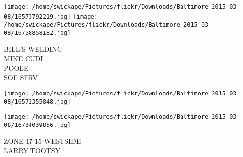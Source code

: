 \documentclass[10pt,letterpaper]{article}
\begin{document}
\texttt{[image: /home/swickape/Pictures/flickr/Downloads/Baltimore 2015-03-08/16573792219.jpg]}
\texttt{[image: /home/swickape/Pictures/flickr/Downloads/Baltimore 2015-03-08/16758858182.jpg]}

BILL'S WELDING\\
MIKE CUDI\\
POOLE\\
SOF SERV
\pagebreak

\texttt{[image: /home/swickape/Pictures/flickr/Downloads/Baltimore 2015-03-08/16572355848.jpg]}

\vspace{0.25in}
\texttt{[image: /home/swickape/Pictures/flickr/Downloads/Baltimore 2015-03-08/16734039856.jpg]}

ZONE 17 15 WESTSIDE\\
LARRY TOOTSY
\pagebreak
\end{document}

